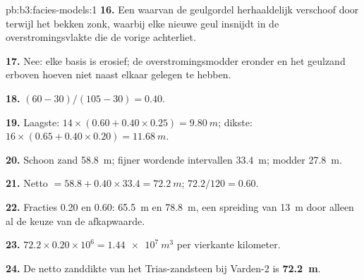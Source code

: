 \begin{solution}{pb:b3:facies-models:1}
\textbf{16.} Een  waarvan de geulgordel herhaaldelijk verschoof
door  terwijl het bekken zonk, waarbij elke nieuwe geul insnijdt in de
overstromingsvlakte die de vorige achterliet.

\textbf{17.} Nee: elke basis is erosief; de overstromingsmodder eronder en het
geulzand erboven hoeven niet naast elkaar gelegen te hebben.

\textbf{18.} $(60 - 30)/(105 - 30) = 0.40$.

\textbf{19.} Laagste: $14\times(0.60 + 0.40\times0.25) = \qty{9.80}{m}$;
dikste: $16\times(0.65 + 0.40\times0.20) = \qty{11.68}{m}$.

\textbf{20.} Schoon zand \qty{58.8}{m}; fijner wordende intervallen \qty{33.4}{m}; modder
\qty{27.8}{m}.

\textbf{21.} Netto $= 58.8 + 0.40\times33.4 = \qty{72.2}{m}$; 
 $72.2/120 = 0.60$.

\textbf{22.} Fracties 0.20 en 0.60: \qty{65.5}{m} en \qty{78.8}{m}, een
spreiding van \qty{13}{m} door alleen al de keuze van de afkapwaarde.

\textbf{23.} $72.2\times0.20\times10^6 = \qty{1.44e7}{m^3}$ per
vierkante kilometer.

\textbf{24.} De netto zanddikte van het Trias-zandsteen bij Varden-2 is
\textbf{\qty[text-series-to-math=true]{72.2}{m}}.
\end{solution}
